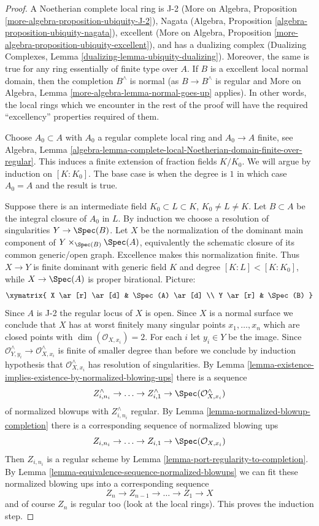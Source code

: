 \begin{proof}
A Noetherian complete local ring is J-2
(More on Algebra, Proposition \ref{more-algebra-proposition-ubiquity-J-2}),
Nagata (Algebra, Proposition \ref{algebra-proposition-ubiquity-nagata}),
excellent (More on Algebra, Proposition
\ref{more-algebra-proposition-ubiquity-excellent}),
and has a dualizing complex
(Dualizing Complexes, Lemma \ref{dualizing-lemma-ubiquity-dualizing}).
Moreover, the same is true for any ring essentially of finite type over $A$.
If $B$ is a excellent local normal domain, then the completion
$B^\wedge$ is normal (as $B \to B^\wedge$ is regular and
More on Algebra, Lemma \ref{more-algebra-lemma-normal-goes-up} applies).
In other words, the local rings which we encounter in the rest of the proof
will have the required ``excellency'' properties required of them.

\medskip\noindent
Choose $A_0 \subset A$ with $A_0$ a regular complete local ring
and $A_0 \to A$ finite, see Algebra, Lemma
\ref{algebra-lemma-complete-local-Noetherian-domain-finite-over-regular}.
This induces a finite extension of fraction fields $K/K_0$.
We will argue by induction on $[K : K_0]$. The base case is
when the degree is $1$ in which case $A_0 = A$ and the result is true.

\medskip\noindent
Suppose there is an intermediate field $K_0 \subset L \subset K$,
$K_0 \not = L \not = K$. Let $B \subset A$ be the integral closure
of $A_0$ in $L$. By induction we choose a resolution of singularities
$Y \to \Spec(B)$. Let $X$ be the normalization of the dominant
main component of $Y \times_{\Spec(B)} \Spec(A)$, equivalently
the schematic closure of its common generic/open graph. Excellence
makes this normalization finite. Thus $X \to Y$ is finite dominant
with generic field $K$ and degree $[K:L] < [K:K_0]$, while
$X \to \Spec(A)$ is proper birational. Picture:
$$
\xymatrix{
X \ar[r] \ar[d] & \Spec(A) \ar[d] \\
Y \ar[r] & \Spec(B)
}
$$
Since $A$ is J-2 the regular locus of $X$ is open. Since $X$
is a normal surface we conclude that $X$ has at worst finitely
many singular points $x_1, \ldots, x_n$ which are closed points with
$\dim(\mathcal{O}_{X, x_i}) = 2$.
For each $i$ let $y_i \in Y$ be the image.
Since
$\mathcal{O}_{Y, y_i}^\wedge \to \mathcal{O}_{X, x_i}^\wedge$
is finite of smaller degree than before we conclude by
induction hypothesis that $\mathcal{O}_{X, x_i}^\wedge$
has resolution of singularities. By
Lemma \ref{lemma-existence-implies-existence-by-normalized-blowing-ups}
there is a sequence
$$
Z^\wedge_{i, n_i} \to \ldots \to Z^\wedge_{i, 1} \to
\Spec(\mathcal{O}_{X, x_i}^\wedge)
$$
of normalized blowups with $Z^\wedge_{i, n_i}$ regular.
By Lemma \ref{lemma-normalized-blowup-completion}
there is a corresponding sequence of normalized blowing ups
$$
Z_{i, n_i} \to \ldots \to Z_{i, 1} \to \Spec(\mathcal{O}_{X, x_i})
$$
Then $Z_{i, n_i}$ is a regular scheme by
Lemma \ref{lemma-port-regularity-to-completion}.
By Lemma \ref{lemma-equivalence-sequence-normalized-blowups}
we can fit these normalized blowing ups
into a corresponding sequence
$$
Z_n \to Z_{n - 1} \to \ldots \to Z_1 \to X
$$
and of course $Z_n$ is regular too (look at the local rings).
This proves the induction step.


\end{proof}
